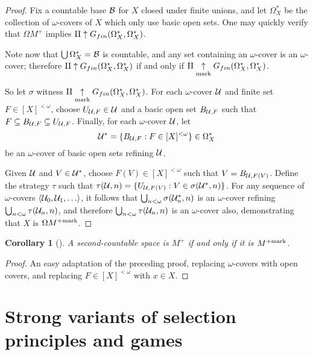 \documentclass{amsart}
\theoremstyle{plain}
\newtheorem{corollary}[theorem]{Corollary}
\theoremstyle{definition}
\theoremstyle{remark}
\theoremstyle{plain}
\theoremstyle{definition}
\theoremstyle{remark}
\begin{document}
\begin{proof}
  Fix a countable base \(\mathcal{B}\) for \(X\) closed under finite unions, and let
  \(\Omega_X^*\) be the collection of \(\omega\)-covers of \(X\) which only
  use basic open sets.
  One may quickly verify that
  \(\Omega M^+\) implies
  \(\mathrm{II}\uparrow G_{fin}(\Omega_X^*,\Omega_X^*)\).

  Note now that
  \(\bigcup\Omega_X^*=\mathcal{B}\) is countable, and any set containing an
  \(\omega\)-cover is an \(\omega\)-cover; therefore
  \(\mathrm{II}\uparrow G_{fin}(\Omega_X^*,\Omega_X^*)\) if and only if
  \(\mathrm{II}\underset{\text{mark}}{\uparrow}G_{fin}(\Omega_X^*,\Omega_X^*)\).

  So let \(\sigma\) witness
  \(\mathrm{II}\underset{\text{mark}}{\uparrow}G_{fin}(\Omega_X^*,\Omega_X^*)\).
  For each \(\omega\)-cover \(\mathcal{U}\) and finite set \(F\in[X]^{<\omega}\),
  choose \(U_{\mathcal{U},F}\in\mathcal{U}\) and a basic open set \(B_{\mathcal{U},F}\)
  such that \(F\subseteq B_{\mathcal{U},F}\subseteq U_{\mathcal{U},F}\).
  Finally, for each \(\omega\)-cover \(\mathcal{U}\), let
  \[
    \mathcal{U}^*
      =
    \{
      B_{\mathcal{U},F}
        :
      F\in[X]^{<\omega}
    \}
      \in
    \Omega_X^*
  \]
  be an \(\omega\)-cover of basic open sets refining \(\mathcal{U}\).

  Given \(\mathcal{U}\) and \(V\in\mathcal{U}^*\), choose
  \(F(V)\in[X]^{<\omega}\) such that \(V=B_{\mathcal{U},F(V)}\).
  Define the strategy \(\tau\) such that
  \(\tau(\mathcal{U},n)=\{U_{\mathcal{U},F(V)}:V\in\sigma(\mathcal{U}^*,n)\}\).
  For any sequence of \(\omega\)-covers \(\<\mc U_0,\mc U_1,\dots\>\),
  it follows that \(\bigcup_{n<\omega}\sigma(\mathcal{U}_n^*,n)\) is an
  \(\omega\)-cover refining \(\bigcup_{n<\omega}\tau(\mathcal{U}_n,n)\), and therefore
  \(\bigcup_{n<\omega}\tau(\mathcal{U}_n,n)\) is an \(\omega\)-cover also,
  demonstrating that \(X\) is \(\Omega M^{+\mathrm{mark}}\).
\end{proof}

\begin{corollary}[\cite{clontzMengerCMUC}]
  A second-countable space is \(M^+\) if and only if
  it is \(M^{+\mathrm{mark}}\).
\end{corollary}

\begin{proof}
  An easy adaptation of the preceding proof, replacing \(\omega\)-covers
  with open covers, and replacing \(F\in[X]^{<\omega}\) with \(x\in X\).
\end{proof}

\section{Strong variants of selection principles and games}
\end{document}

